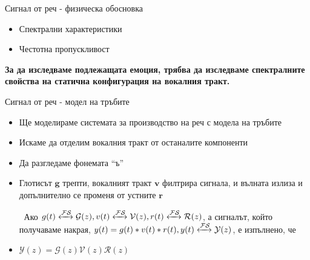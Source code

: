 \documentclass[9pt]{beamer}
\begin{document}
    \begin{frame}{Сигнал от реч - физическа обосновка}
        \begin{itemize}
            \item Спектрални характеристики
            \pause
            \item Честотна пропускливост
        \end{itemize}
        \pause
        \pause
        \textbf{За да изследваме подлежащата емоция, трябва да изследваме спектралните свойства на статична конфигурация на вокалния тракт.}
    \end{frame}

    \begin{frame}{Сигнал от реч - модел на тръбите}
        \begin{itemize}
            \setlength\itemsep{\fill}
            \item Ще моделираме системата за производство на реч с модела на тръбите
            \pause
            \item Искаме да отделим вокалния тракт от останалите компоненти
            \pause
            \item Да разгледаме фонемата ``ъ''
            \pause
            \item Глотисът $\textbf{g}$ трепти, вокалният тракт $\textbf{v}$ филтрира сигнала, и вълната излиза и допълнително се променя от устните $\textbf{r}$ 
            \pause
            \item[$\ $] Ако  $g(t) \xleftrightarrow{\mathcal{F}\mathcal{S}} \mathcal{G}(z), v(t) \xleftrightarrow{\mathcal{F}\mathcal{S}} \mathcal{V}(z), r(t) \xleftrightarrow{\mathcal{F}\mathcal{S}} \mathcal{R}(z)$, а сигналът, който получаваме накрая, $y(t)=g(t)\ast v(t) \ast r(t), y(t) \xleftrightarrow{\mathcal{F}\mathcal{S}} \mathcal{Y}(z)$, е изпълнено, че
            \pause
            \item $\mathcal{Y}(z) = \mathcal{G}(z) \mathcal{V}(z) \mathcal{R}(z)$
        \end{itemize}
    \end{frame}
\end{document}
